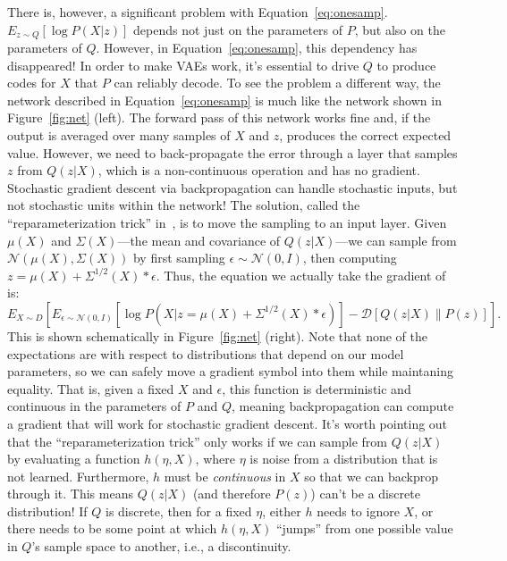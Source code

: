 \documentclass[a4paper, 11pt]{article} %
\begin{document}
There is, however, a significant problem with Equation~\ref{eq:onesamp}.
$E_{z\sim Q}\left[\log P(X|z)  \right]$ depends not just on the parameters of $P$, but also on the parameters of $Q$.
However, in Equation~\ref{eq:onesamp}, this dependency has disappeared!
In order to make VAEs work, it's essential to drive $Q$ to produce codes for $X$ that $P$ can reliably decode.  
To see the problem a different way, the network described in Equation~\ref{eq:onesamp} is much like the network shown in Figure~\ref{fig:net} (left).
The forward pass of this network works fine and, if the output is averaged over many samples of $X$ and $z$, produces the correct expected value.
However, we need to back-propagate the error through a layer that samples $z$ from $Q(z|X)$, which is a non-continuous operation and has no gradient.
Stochastic gradient descent via backpropagation can handle stochastic inputs, but not stochastic units within the network!
The solution, called the ``reparameterization trick'' in~\cite{Kingma14a}, is to move the sampling to an input layer.
Given $\mu(X)$ and $\Sigma(X)$---the mean and covariance of $Q(z|X)$---we can sample from $\mathcal{N}(\mu(X),\Sigma(X))$ by first sampling $\epsilon \sim \mathcal{N}(0,I)$, then computing $z=\mu(X)+\Sigma^{1/2}(X)*\epsilon$. %
Thus, the equation we actually take the gradient of is:
\begin{equation}
 E_{X\sim D}\left[E_{\epsilon\sim\mathcal{N}(0,I)}[\log P(X|z=\mu(X)+\Sigma^{1/2}(X)*\epsilon)]-\mathcal{D}\left[Q(z|X)\|P(z)\right]\right].
\end{equation}
This is shown schematically in Figure~\ref{fig:net} (right).  
Note that none of the expectations are with respect to distributions that depend on our model parameters, so we can safely move a gradient symbol into them while maintaning equality.
That is, given a fixed $X$ and $\epsilon$, this function is deterministic and continuous in the parameters of $P$ and $Q$, meaning backpropagation can compute a gradient that will work for stochastic gradient descent.
It's worth pointing out that the ``reparameterization trick'' only works if we can sample from $Q(z|X)$ by evaluating a function $h(\eta,X)$, where $\eta$ is noise from a distribution that is not learned.
Furthermore, $h$ must be \textit{continuous} in $X$ so that we can backprop through it.  
This means $Q(z|X)$ (and therefore $P(z)$) can't be a discrete distribution!
If $Q$ is discrete, then for a fixed $\eta$, either $h$ needs to ignore $X$, or there needs to be some point at which $h(\eta,X)$ ``jumps'' from one possible value in $Q$'s sample space to another, i.e., a discontinuity.
\end{document}
